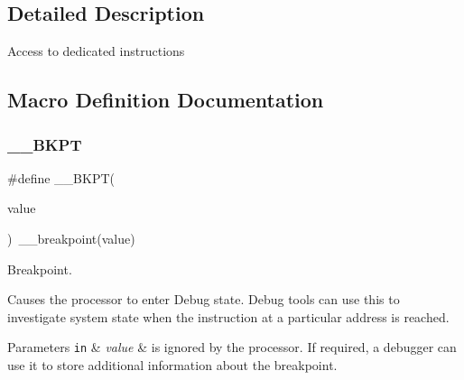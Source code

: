 \subsection{Detailed Description}
Access to dedicated instructions 

\subsection{Macro Definition Documentation}
\mbox{\label{group___c_m_s_i_s___core___instruction_interface_ga15ea6bd3c507d3e81c3b3a1258e46397}} 
\subsubsection{\texorpdfstring{\+\_\+\+\_\+\+B\+K\+PT}{\_\_BKPT}\hspace{0.1cm}{\footnotesize\ttfamily [1/3]}}
{\footnotesize\ttfamily \#define \+\_\+\+\_\+\+B\+K\+PT(\begin{DoxyParamCaption}\item[{}]{value }\end{DoxyParamCaption})~\+\_\+\+\_\+breakpoint(value)}



Breakpoint. 

Causes the processor to enter Debug state. Debug tools can use this to investigate system state when the instruction at a particular address is reached. 
\begin{DoxyParams}[1]{Parameters}
\mbox{\tt in}  & {\em value} & is ignored by the processor. If required, a debugger can use it to store additional information about the breakpoint. \\
\hline
\end{DoxyParams}
\mbox{\label{group___c_m_s_i_s___core___instruction_interface_ga15ea6bd3c507d3e81c3b3a1258e46397}} 
